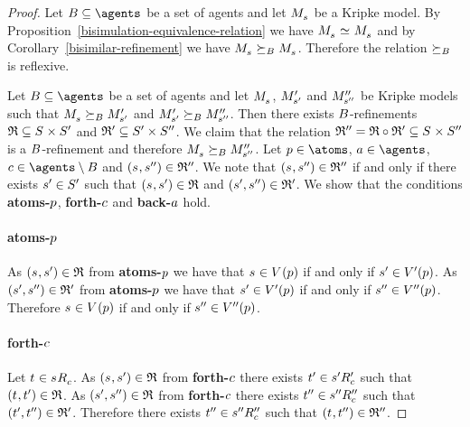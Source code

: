 \begin{proof}
    Let $\agentsB \subseteq \agents$ be a set of agents and let $\kPModel{\kStateS}$ be a Kripke model.
    By Proposition~\ref{bisimulation-equivalence-relation} we have $\kPModel{\kStateS} \bisimilar \kPModel{\kStateS}$ and by Corollary~\ref{bisimilar-refinement} we have $\kPModel{\kStateS} \simulatesBs \kPModel{\kStateS}$.
    Therefore the relation $\succeq_{B}$ is reflexive.

    Let $\agentsB \subseteq \agents$ be a set of agents and let $\kPModel{\kStateS}$, ${M^{\prime}_{{s}^{\prime}}}$ and ${M^{\prime\prime}_{{s}^{\prime\prime}}}$ be Kripke models such that $\kPModel{\kStateS} \simulatesBs \kPModelP{\kStateSP}$ and ${M^{\prime}_{{s}^{\prime}}} \succeq_{B} {M^{\prime\prime}_{{s}^{\prime\prime}}}$.
    Then there exists $B$-refinements $\refinement \subseteq \kStates \times \kStatesP$ and $\mathfrak{R}' \subseteq {S^{\prime}} \times {S^{\prime\prime}}$.
    We claim that the relation $\refinement'' = \refinement \circ \refinement' \subseteq \kStates \times \kStatesPP$ is a $B$-refinement and therefore $\kPModel{\kStateS} \simulatesBs \kPModelPP{\kStateSPP}$.
    Let $\atomP \in \atoms$, $\agentA \in \agents$, $\agentC \in \agents \setminus \agentsB$ and $(\kStateS, \kStateSPP) \in \refinement''$.
    We note that $(\kStateS, \kStateSPP) \in \refinement''$ if and only if there exists ${s}^{\prime} \in {S^{\prime}}$ such that $(\kStateS, \kStateSP) \in \refinement$ and $({s}^{\prime}, {s}^{\prime\prime}) \in \mathfrak{R}'$.
    We show that the conditions {\bf atoms-$p$}, {\bf forth-$c$} and {\bf back-$a$} hold.

    \paragraph{atoms-$p$}
    As $(\kStateS, \kStateSP) \in \refinement$ from {\bf atoms-$p$} we have that $\kStateS \in \kValuation(\atomP)$ if and only if ${s}^{\prime} \in {V^{\prime}}(p)$.
    As $({s}^{\prime}, {s}^{\prime\prime}) \in \mathfrak{R}'$ from {\bf atoms-$p$} we have that ${s}^{\prime} \in {V^{\prime}}(p)$ if and only if ${s}^{\prime\prime} \in {V^{\prime\prime}}(p)$.
    Therefore $\kStateS \in \kValuation(\atomP)$ if and only if ${s}^{\prime\prime} \in {V^{\prime\prime}}(p)$.

    \paragraph{forth-$c$}
    Let $\kStateT \in \kSuccessorsC{\kStateS}$.
    As $(\kStateS, \kStateSP) \in \refinement$ from {\bf forth-$c$} there exists ${t}^{\prime} \in {{s}^{\prime}} {R^{\prime}_{c}}$ such that $(\kStateT, \kStateTP) \in \refinement$.
    As $({s}^{\prime}, {s}^{\prime\prime}) \in \mathfrak{R}$ from {\bf forth-$c$} there exists ${t}^{\prime\prime} \in {{s}^{\prime\prime}} {R^{\prime\prime}_{c}}$ such that $({t}^{\prime}, {t}^{\prime\prime}) \in \mathfrak{R}'$.
    Therefore there exists ${t}^{\prime\prime} \in {{s}^{\prime\prime}} {R^{\prime\prime}_{c}}$ such that $(\kStateT, \kStateTPP) \in \refinement''$.


\end{proof}
